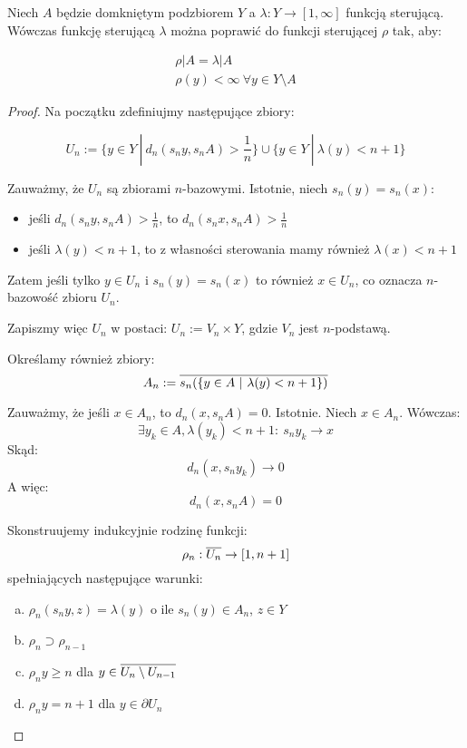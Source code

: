 \begin{thm}
\label{thm:steering-function}
Niech $A$ będzie domkniętym podzbiorem $Y$ a $\lambda: Y \rightarrow [1,\infty]$ funkcją sterującą. Wówczas funkcję sterującą $\lambda$ można poprawić do funkcji sterującej $\rho$ tak, aby:

\begin{gather}
 \rho|A = \lambda|A \\
 \rho(y) < \infty\ \forall y \in Y \setminus A
\end{gather}

\begin{proof}
  
  Na początku zdefiniujmy następujące zbiory:
  
  \[U_n := \{y \in Y\ |\ d_n(s_n y, s_n A) > \frac{1}{n}\} \cup \{y \in Y\ |\ \lambda(y) < n+1\}\]
  
  Zauważmy, że $U_n$ są zbiorami $n$-bazowymi. Istotnie, niech $s_n(y) = s_n(x)$:
  \begin{itemize}
    \item jeśli $d_n(s_n y, s_n A) > \frac{1}{n}$, to $d_n(s_n x, s_n A) > \frac{1}{n}$
    \item jeśli $\lambda(y) < n+1$, to z własności sterowania mamy również $\lambda(x) < n+1$
  \end{itemize}
  Zatem jeśli tylko $y \in U_n$ i $s_n(y) = s_n(x)$ to również $x \in U_n$, co oznacza $n$-bazowość zbioru $U_n$.
  
  Zapiszmy więc $U_n$ w postaci: $U_n := V_n \times Y$, gdzie $V_n$ jest $n$-podstawą.
  
  Określamy również zbiory:
  \[A_n := \overline{s_n({\{y \in A\ |\ \lambda(y) < n+1\}})}\]
  
  Zauważmy, że jeśli $x \in A_n$, to $d_n(x, s_n A) = 0$. Istotnie. Niech $x \in A_n$. Wówczas:
  \[\exists y_k \in A, \lambda(y_k) < n+1:\ s_n y_k \rightarrow x\]
  Skąd:
  \[d_n(x, s_n y_k) \rightarrow 0\]
  A więc:
  \[d_n(x, s_n A) = 0\]
  
  Skonstruujemy indukcyjnie rodzinę funkcji:
  \[\rho_n: \overline{U_n} \rightarrow [1, n+1]\]
  spełniających następujące warunki:
  \begin{enumerate}[(a)]
    \item \label{induction-1} $\rho_n(s_n y, z) = \lambda(y)$ o ile $s_n(y) \in A_n$, $z \in Y$
    \item \label{induction-2} $\rho_n \supset \rho_{n-1}$
    \item \label{induction-3} $\rho_n y \geq n$ dla $y \in \overline{U_n \setminus U_{n-1}}$
    \item \label{induction-4} $\rho_n y = n+1$ dla $y \in \partial U_n$
  \end{enumerate}
  

\end{proof}
\end{thm}
